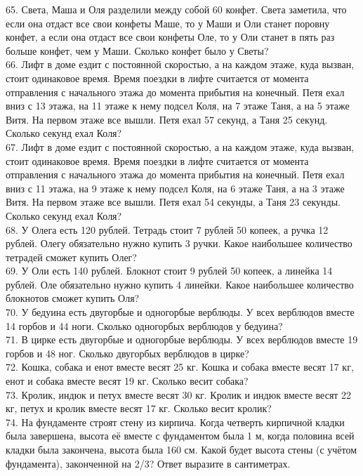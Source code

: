 \documentclass[12pt]{article}
\begin{document}
65. Света, Маша и Оля разделили между собой 60 конфет. Света заметила, что если она отдаст все свои конфеты Маше, то у Маши и Оли станет поровну конфет, а если она отдаст все свои конфеты Оле, то у Оли станет в пять раз больше конфет, чем у Маши. Сколько конфет было у Светы?\\
66. Лифт в доме ездит с постоянной скоростью, а на каждом этаже, куда вызван, стоит одинаковое время. Время поездки в лифте считается от момента отправления с начального этажа до момента прибытия на конечный. Петя ехал вниз с 13 этажа, на 11 этаже к нему подсел Коля, на 7 этаже Таня, а на 5 этаже Витя. На первом этаже все вышли. Петя ехал 57 секунд, а Таня 25 секунд. Сколько секунд ехал Коля?\\
67. Лифт в доме ездит с постоянной скоростью, а на каждом этаже, куда вызван, стоит одинаковое время. Время поездки в лифте считается от момента отправления с начального этажа до момента прибытия на конечный. Петя ехал вниз с 11 этажа, на 9 этаже к нему подсел Коля, на 6 этаже Таня, а на 3 этаже Витя. На первом этаже все вышли. Петя ехал 54 секунды, а Таня 23 секунды. Сколько секунд ехал Коля?\\
68. У Олега есть 120 рублей. Тетрадь стоит 7 рублей 50 копеек, а ручка 12 рублей. Олегу обязательно нужно купить 3 ручки. Какое наибольшее количество тетрадей сможет купить Олег?\\
69. У Оли есть 140 рублей. Блокнот стоит 9 рублей 50 копеек, а линейка 14 рублей. Оле обязательно нужно купить 4 линейки. Какое наибольшее количество блокнотов сможет купить Оля?\\
70. У бедуина есть двугорбые и одногорбые верблюды. У всех верблюдов вместе 14 горбов и 44 ноги. Сколько одногорбых верблюдов у бедуина?\\
71. В цирке есть двугорбые и одногорбые верблюды. У всех верблюдов вместе 19 горбов и 48 ног. Сколько двугорбых верблюдов в цирке?\\
72. Кошка, собака и енот вместе весят 25 кг. Кошка и собака вместе весят 17 кг, енот и собака вместе весят 19 кг. Сколько весит собака?\\
73. Кролик, индюк и петух вместе весят 30 кг. Кролик и индюк вместе весят 22 кг, петух и кролик вместе весят 17 кг. Сколько весит кролик?\\
74. На фундаменте строят стену из кирпича. Когда четверть кирпичной кладки была завершена, высота её вместе с фундаментом была 1 м, когда половина всей кладки была закончена, высота была 160 см. Какой будет высота стены (с учётом фундамента), законченной на 2/3? Ответ выразите в сантиметрах.\\
\end{document}
